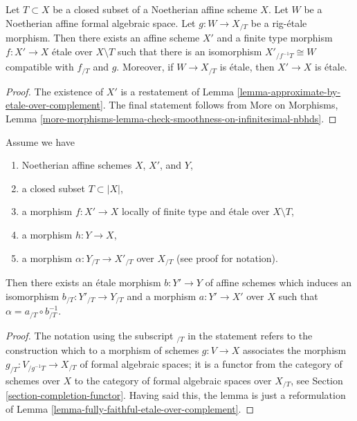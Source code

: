 \begin{lemma}
\label{lemma-algebraize-rig-etale-affine}
Let $T \subset X$ be a closed subset of a Noetherian affine scheme $X$.
Let $W$ be a Noetherian affine formal algebraic space.
Let $g : W \to X_{/T}$ be a rig-\'etale morphism. Then there exists
an affine scheme $X'$ and a finite type morphism $f : X' \to X$
\'etale over $X \setminus T$ such that there is an isomorphism
$X'_{/f^{-1}T} \cong W$ compatible with $f_{/T}$ and $g$.
Moreover, if $W \to X_{/T}$ is \'etale, then $X' \to X$ is \'etale.
\end{lemma}

\begin{proof}
The existence of $X'$ is a restatement of
Lemma \ref{lemma-approximate-by-etale-over-complement}.
The final statement follows from
More on Morphisms, Lemma
\ref{more-morphisms-lemma-check-smoothness-on-infinitesimal-nbhds}.
\end{proof}

\begin{lemma}
\label{lemma-algebraize-morphism-rig-etale}
Assume we have
\begin{enumerate}
\item Noetherian affine schemes $X$, $X'$, and $Y$,
\item a closed subset $T \subset |X|$,
\item a morphism $f : X' \to X$ locally of finite type
and \'etale over $X \setminus T$,
\item a morphism $h : Y \to X$,
\item a morphism $\alpha : Y_{/T} \to X'_{/T}$ over $X_{/T}$
(see proof for notation).
\end{enumerate}
Then there exists an \'etale morphism $b : Y' \to Y$ of affine schemes
which induces an isomorphism $b_{/T} : Y'_{/T} \to Y_{/T}$
and a morphism $a : Y' \to X'$ over $X$
such that $\alpha = a_{/T} \circ b_{/T}^{-1}$.
\end{lemma}

\begin{proof}
The notation using the subscript ${}_{/T}$ in the statement
refers to the construction which to a morphism of schemes $g : V \to X$
associates the morphism $g_{/T} : V_{/g^{-1}T} \to X_{/T}$ of formal
algebraic spaces; it is a functor from the category of schemes over $X$
to the category of formal algebraic spaces over $X_{/T}$, see
Section \ref{section-completion-functor}.
Having said this, the lemma is just a reformulation of
Lemma \ref{lemma-fully-faithful-etale-over-complement}.
\end{proof}

